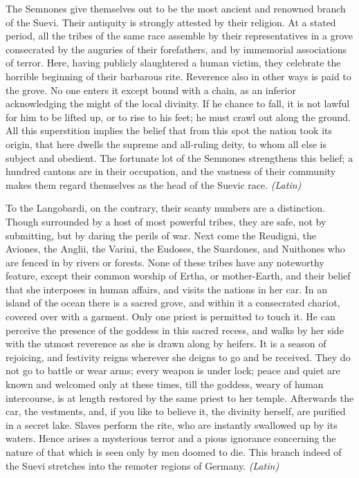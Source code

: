 
The Semnones give themselves out to be the most ancient and renowned branch of the Suevi. Their antiquity is strongly attested by their religion. At a stated period, all the tribes of the same race assemble by their representatives in a grove consecrated by the auguries of their forefathers, and by immemorial associations of terror. Here, having publicly slaughtered a human victim, they celebrate the horrible beginning of their barbarous rite. Reverence also in other ways is paid to the grove. No one enters it except bound with a chain, as an inferior acknowledging the might of the local divinity. If he chance to fall, it is not lawful for him to be lifted up, or to rise to his feet; he must crawl out along the ground. All this superstition implies the belief that from this spot the nation took its origin, that here dwells the supreme and all-ruling deity, to whom all else is subject and obedient. The fortunate lot of the Semnones strengthens this belief; a hundred cantons are in their occupation, and the vastness of their community makes them regard themselves as the head of the Suevic race. \emph{(Latin)}


To the Langobardi, on the contrary, their scanty numbers are a distinction. Though surrounded by a host of most powerful tribes, they are safe, not by submitting, but by daring the perils of war. Next come the Reudigni, the Aviones, the Anglii, the Varini, the Eudoses, the Suardones, and Nuithones who are fenced in by rivers or forests. None of these tribes have any noteworthy feature, except their common worship of Ertha, or mother-Earth, and their belief that she interposes in human affairs, and visits the nations in her car. In an island of the ocean there is a sacred grove, and within it a consecrated chariot, covered over with a garment. Only one priest is permitted to touch it. He can perceive the presence of the goddess in this sacred recess, and walks by her side with the utmost reverence as she is drawn along by heifers. It is a season of rejoicing, and festivity reigns wherever she deigns to go and be received. They do not go to battle or wear arms; every weapon is under lock; peace and quiet are known and welcomed only at these times, till the goddess, weary of human intercourse, is at length restored by the same priest to her temple. Afterwards the car, the vestments, and, if you like to believe it, the divinity herself, are purified in a secret lake. Slaves perform the rite, who are instantly swallowed up by its waters. Hence arises a mysterious terror and a pious ignorance concerning the nature of that which is seen only by men doomed to die. This branch indeed of the Suevi stretches into the remoter regions of Germany. \emph{(Latin)}

